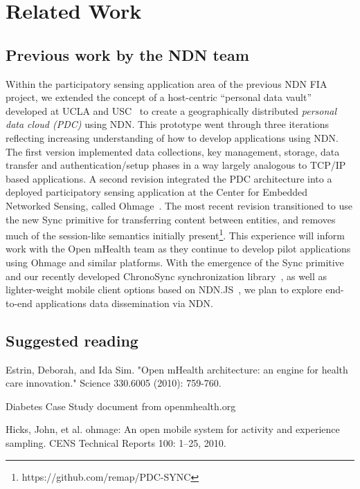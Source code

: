 \section{Related Work}

\subsection{Previous work by the NDN team}

Within the participatory sensing application area of the previous NDN
FIA project, we extended the concept of a host-centric ``personal data
vault'' developed at UCLA and USC~\cite{mun2010personal} to create a
geographically distributed \emph{personal data cloud (PDC)} using NDN.
This prototype went through three iterations reflecting increasing
understanding of how to develop applications using NDN.   The first
version implemented data collections, key management, storage, data
transfer and authentication/setup phases in a way largely analogous to
TCP/IP based applications.  A second revision integrated the PDC
architecture into a deployed participatory sensing application at the
Center for Embedded Networked Sensing, called
Ohmage~\cite{ramanathan2012ohmage}.
The most recent revision transitioned to use the
new Sync primitive for transferring content between entities, and removes
much of the session-like semantics initially
present\footnote{https://github.com/remap/PDC-SYNC}. This experience
will inform work with the Open mHealth team as they continue to develop
pilot applications using Ohmage and similar platforms. With the emergence
of the Sync primitive and our recently developed
ChronoSync synchronization library~\cite{Afanasyev13:CHRONOSYNC}, as well as lighter-weight mobile client
options based on NDN.JS~\cite{ndn-js-NOMEN}, we plan to explore end-to-end applications data dissemination via NDN.


\subsection{Suggested reading}

Estrin, Deborah, and Ida Sim. "Open mHealth architecture: an engine for health care innovation." Science 330.6005 (2010): 759-760.

Diabetes Case Study document from openmhealth.org 

Hicks, John, et al. ohmage: An open mobile system for activity and experience sampling. CENS Technical Reports 100: 1–25, 2010.


